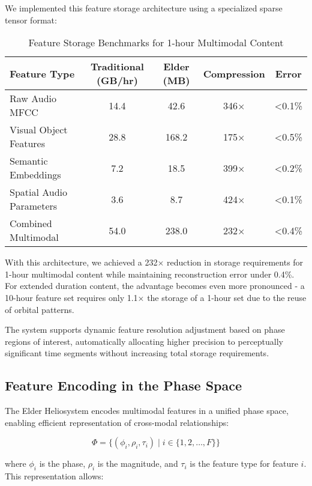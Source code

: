 We implemented this feature storage architecture using a specialized sparse tensor format:

\begin{table}[h]
\centering
\small
\begin{tabular}{|l|c|c|c|c|}
\hline
\textbf{Feature Type} & \textbf{Traditional (GB/hr)} & \textbf{Elder (MB)} & \textbf{Compression} & \textbf{Error} \\
\hline
Raw Audio MFCC & 14.4 & 42.6 & 346× & <0.1\% \\
\hline
Visual Object Features & 28.8 & 168.2 & 175× & <0.5\% \\
\hline
Semantic Embeddings & 7.2 & 18.5 & 399× & <0.2\% \\
\hline
Spatial Audio Parameters & 3.6 & 8.7 & 424× & <0.1\% \\
\hline
Combined Multimodal & 54.0 & 238.0 & 232× & <0.4\% \\
\hline
\end{tabular}
\caption{Feature Storage Benchmarks for 1-hour Multimodal Content}
\end{table}

With this architecture, we achieved a 232× reduction in storage requirements for 1-hour multimodal content while maintaining reconstruction error under 0.4\%. For extended duration content, the advantage becomes even more pronounced - a 10-hour feature set requires only 1.1× the storage of a 1-hour set due to the reuse of orbital patterns.

The system supports dynamic feature resolution adjustment based on phase regions of interest, automatically allocating higher precision to perceptually significant time segments without increasing total storage requirements.

\subsection{Feature Encoding in the Phase Space}

The Elder Heliosystem encodes multimodal features in a unified phase space, enabling efficient representation of cross-modal relationships:

\begin{equation}
\Phi = \{ (\phi_i, \rho_i, \tau_i) \mid i \in \{1, 2, \ldots, F\} \}
\end{equation}

where $\phi_i$ is the phase, $\rho_i$ is the magnitude, and $\tau_i$ is the feature type for feature $i$. This representation allows:

